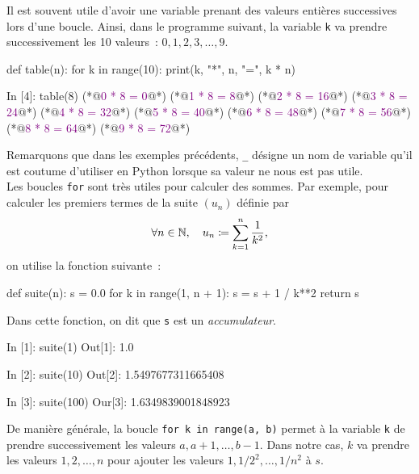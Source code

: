 \documentclass{magnoliaold}
\begin{document}
\vspace{2ex}
Il est souvent utile d'avoir une variable prenant des valeurs entières successives lors d'une
boucle. Ainsi, dans le programme suivant, la variable \verb_k_ va prendre successivement
les 10 valeurs~: $0, 1, 2, 3,\ldots, 9$.

\begin{pythoncodeline}
def table(n):
    for k in range(10):
        print(k, "*", n, "=", k * n)
\end{pythoncodeline}

\begin{pythoncode}
In [4]: table(8)
(*@\textcolor{purple}{0 * 8 = 0}@*)
(*@\textcolor{purple}{1 * 8 = 8}@*)
(*@\textcolor{purple}{2 * 8 = 16}@*)
(*@\textcolor{purple}{3 * 8 = 24}@*)
(*@\textcolor{purple}{4 * 8 = 32}@*)
(*@\textcolor{purple}{5 * 8 = 40}@*)
(*@\textcolor{purple}{6 * 8 = 48}@*)
(*@\textcolor{purple}{7 * 8 = 56}@*)
(*@\textcolor{purple}{8 * 8 = 64}@*)
(*@\textcolor{purple}{9 * 8 = 72}@*)
\end{pythoncode}
\noindent Remarquons que dans les exemples précédents, \verb!_! désigne un nom de
variable qu'il est coutume d'utiliser en Python lorsque sa valeur ne nous est pas utile.\\

Les boucles \verb_for_ sont très utiles pour calculer des sommes.
Par exemple, pour calculer les premiers termes de la suite $(u_n)$ définie par
\[\forall n\in\mathbb{N} ,\quad u_n \coloneqq \sum_{k=1}^n \frac{1}{k^2},\]
on utilise la fonction suivante~:
\begin{pythoncodeline}
def suite(n):
    s = 0.0
    for k in range(1, n + 1):
        s = s + 1 / k**2
    return s
\end{pythoncodeline}
Dans cette fonction, on dit que \verb_s_ est un \emph{accumulateur}.
\begin{pythoncode}
In [1]: suite(1)
Out[1]: 1.0

In [2]: suite(10)
Out[2]: 1.5497677311665408

In [3]: suite(100)
Our[3]: 1.6349839001848923
\end{pythoncode}
De manière générale, la boucle \verb!for k in range(a, b)! permet à la variable \verb_k_ de prendre successivement
les valeurs $a, a+1, \ldots, b-1$. Dans notre cas, $k$ va prendre les valeurs
$1, 2, \ldots, n$ pour ajouter les valeurs $1, 1/2^2,\ldots,1/n^2$ à $s$.\\
\end{document}
